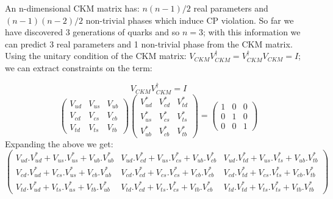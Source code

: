 \documentclass[12pt,a4paper]{article}
\begin{document}
An n-dimensional CKM matrix has: $ {n(n-1)}/2 $ real parameters and $ (n-1)(n-2)/2 $ non-trivial phases which induce CP violation. So far we have discovered 3 generations of quarks and so $n=3$; with this information we can predict 3 real parameters and 1 non-trivial phase from the CKM matrix. Using the unitary condition of the CKM matrix: $ V_{CKM}  V_{CKM}^\dagger = V_{CKM}^\dagger V_{CKM} = I $; we can extract constraints on the term:
 
 \begin{comment}
 \[
\left(
 \begin{array}{ccc}
  V_{ud} & V_{us} & V_{ub} \\
  V_{cd} & V_{cs} & V_{cb} \\
  V_{td} & V_{ts} & V_{tb}
 \end{array}
 \right)
 \left(
 \begin{array}{ccc}
  V_{ud} & V_{us} & V_{ub} \\
  V_{cd} & V_{cs} & V_{cb} \\
  V_{td} & V_{ts} & V_{tb}
 \end{array}
 \right)^\dagger
 =
  \left(
 \begin{array}{ccc}
  1 & 0 & 0 \\
  0 & 1 & 0 \\
  0 & 0 & 1
 \end{array}
 \right)
\]
\end{comment}
\par
\[ V_{CKM}  V_{CKM}^\dagger = I \]
 \[
\left(
 \begin{array}{ccc}
  V_{ud} & V_{us} & V_{ub} \\
  V_{cd} & V_{cs} & V_{cb} \\
  V_{td} & V_{ts} & V_{tb}
 \end{array}
 \right)
 \left(
 \begin{array}{ccc}
  V_{ud}^* & V_{cd}^* & V_{td}^* \\
  V_{us}^* & V_{cs}^* & V_{ts}^* \\
  V_{ub}^* & V_{cb}^* & V_{tb}^*
 \end{array}
 \right)
 =
  \left(
 \begin{array}{ccc}
  1 & 0 & 0 \\
  0 & 1 & 0 \\
  0 & 0 & 1
 \end{array}
 \right)
\]
Expanding the above we get:
\[
 \left(
 \begin{array}{ccc}
V_{ud}.V_{ud}^* +  V_{us}. V_{us}^* + V_{ub}.V_{ub}^*  &  V_{ud}.V_{cd}^* +  V_{us}. V_{cs}^* + V_{ub}.V_{cb}^* & V_{ud}.V_{td}^* +  V_{us}. V_{ts}^* + V_{ub}.V_{tb}^* \\

V_{cd}.V_{ud}^* +  V_{cs}. V_{us}^* + V_{cb}.V_{ub}^* & V_{cd}.V_{cd}^* +  V_{cs}. V_{cs}^* + V_{cb}.V_{cb}^* & V_{cd}.V_{td}^* +  V_{cs}. V_{ts}^* + V_{cb}.V_{tb}^* \\

V_{td}.V_{ud}^* +  V_{ts}. V_{us}^* + V_{tb}.V_{ub}^* & V_{td}.V_{cd}^* +  V_{ts}. V_{cs}^* + V_{tb}.V_{cb}^* & V_{td}.V_{td}^* +  V_{ts}. V_{ts}^* + V_{tb}.V_{tb}^*

 \end{array}
 \right)
\]
\end{document}
